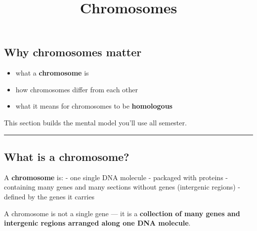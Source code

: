\documentclass[
  letterpaper,
  DIV=11,
  numbers=noendperiod]{scrartcl}
\title{Chromosomes}
\author{}
\date{}
\providecommand{\tightlist}{%
  \setlength{\itemsep}{0pt}\setlength{\parskip}{0pt}}
\renewcommand*\contentsname{Table of contents}
\newcommand\contentsname{Table of contents}
\begin{document}
\maketitle

\renewcommand*\contentsname{Table of contents}
{
\hypersetup{linkcolor=}
\setcounter{tocdepth}{3}
\tableofcontents
}

\subsection{Why chromosomes matter}\label{why-chromosomes-matter}

\begin{itemize}
\tightlist
\item
  what a \textbf{chromosome} is
\item
  how chromosomes differ from each other
\item
  what it means for chromosomes to be \textbf{homologous}
\end{itemize}

This section builds the mental model you'll use all semester.

\begin{center}\rule{0.5\linewidth}{0.5pt}\end{center}

\subsection{What is a chromosome?}\label{what-is-a-chromosome}

A \textbf{chromosome} is: - one single DNA molecule - packaged with
proteins - containing many genes and many sections without genes
(intergenic regions) - defined by the genes it carries

\begin{tcolorbox}[enhanced jigsaw, colframe=quarto-callout-important-color-frame, leftrule=.75mm, bottomrule=.15mm, opacitybacktitle=0.6, opacityback=0, left=2mm, rightrule=.15mm, coltitle=black, bottomtitle=1mm, titlerule=0mm, toptitle=1mm, breakable, title=\textcolor{quarto-callout-important-color}{\faExclamation}\hspace{0.5em}{Key idea}, colbacktitle=quarto-callout-important-color!10!white, arc=.35mm, toprule=.15mm, colback=white]

A chromosome is not a single gene --- it is a \textbf{collection of many
genes and intergenic regions arranged along one DNA molecule}.

\end{tcolorbox}
\end{document}
